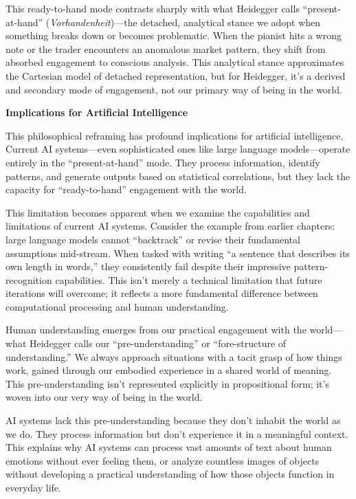\documentclass[
  Letterpaper,
]{scrbook}
\begin{document}
This ready-to-hand mode contrasts sharply with what Heidegger calls
``present-at-hand'' (\emph{Vorhandenheit})---the detached, analytical
stance we adopt when something breaks down or becomes problematic. When
the pianist hits a wrong note or the trader encounters an anomalous
market pattern, they shift from absorbed engagement to conscious
analysis. This analytical stance approximates the Cartesian model of
detached representation, but for Heidegger, it's a derived and secondary
mode of engagement, not our primary way of being in the world.

\textbf{Implications for Artificial Intelligence}

This philosophical reframing has profound implications for artificial
intelligence. Current AI systems---even sophisticated ones like large
language models---operate entirely in the ``present-at-hand'' mode. They
process information, identify patterns, and generate outputs based on
statistical correlations, but they lack the capacity for
``ready-to-hand'' engagement with the world.

This limitation becomes apparent when we examine the capabilities and
limitations of current AI systems. Consider the example from earlier
chapters: large language models cannot ``backtrack'' or revise their
fundamental assumptions mid-stream. When tasked with writing ``a
sentence that describes its own length in words,'' they consistently
fail despite their impressive pattern-recognition capabilities. This
isn't merely a technical limitation that future iterations will
overcome; it reflects a more fundamental difference between
computational processing and human understanding.

Human understanding emerges from our practical engagement with the
world---what Heidegger calls our ``pre-understanding'' or
``fore-structure of understanding.'' We always approach situations with
a tacit grasp of how things work, gained through our embodied experience
in a shared world of meaning. This pre-understanding isn't represented
explicitly in propositional form; it's woven into our very way of being
in the world.

AI systems lack this pre-understanding because they don't inhabit the
world as we do. They process information but don't experience it in a
meaningful context. This explains why AI systems can process vast
amounts of text about human emotions without ever feeling them, or
analyze countless images of objects without developing a practical
understanding of how those objects function in everyday life.
\end{document}
